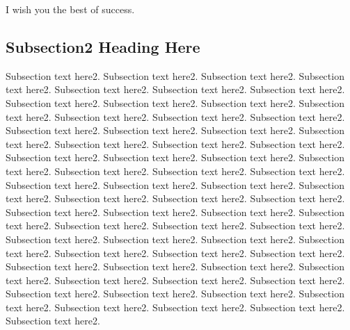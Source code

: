 \documentclass[journal]{IEEEtran}
\begin{document}
I wish you the best of success.

\subsection{Subsection2 Heading Here}
Subsection text here2.
Subsection text here2.
Subsection text here2.
Subsection text here2.
Subsection text here2.
Subsection text here2.
Subsection text here2.
Subsection text here2.
Subsection text here2.
Subsection text here2.
Subsection text here2.
Subsection text here2.
Subsection text here2.
Subsection text here2.
Subsection text here2.
Subsection text here2.
Subsection text here2.
Subsection text here2.
Subsection text here2.
Subsection text here2.
Subsection text here2.
Subsection text here2.
Subsection text here2.
Subsection text here2.
Subsection text here2.
Subsection text here2.
Subsection text here2.
Subsection text here2.
Subsection text here2.
Subsection text here2.
Subsection text here2.
Subsection text here2.
Subsection text here2.
Subsection text here2.
Subsection text here2.
Subsection text here2.
Subsection text here2.
Subsection text here2.
Subsection text here2.
Subsection text here2.
Subsection text here2.
Subsection text here2.
Subsection text here2.
Subsection text here2.
Subsection text here2.
Subsection text here2.
Subsection text here2.
Subsection text here2.
Subsection text here2.
Subsection text here2.
Subsection text here2.
Subsection text here2.
Subsection text here2.
Subsection text here2.
Subsection text here2.
Subsection text here2.
Subsection text here2.
Subsection text here2.
Subsection text here2.
Subsection text here2.
Subsection text here2.
Subsection text here2.
Subsection text here2.
Subsection text here2.
\end{document}
